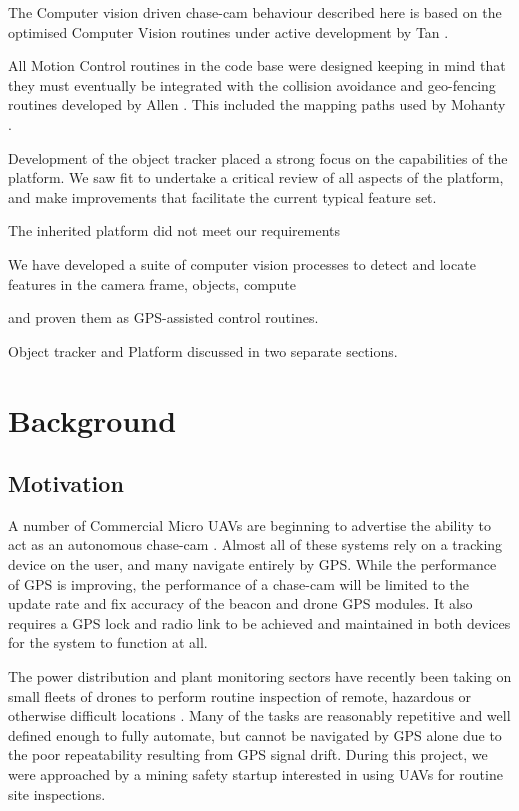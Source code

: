 \documentclass{article}
\begin{document}
    The Computer vision driven chase-cam behaviour described here is based on the optimised Computer Vision routines under active development by Tan \cite{Tan}.

    All Motion Control routines in the code base were designed keeping in mind that they must eventually be integrated with the collision avoidance and geo-fencing routines developed by Allen \cite{Allen}.  This included the mapping paths used by Mohanty \cite{Mohanty}.

    Development of the object tracker placed a strong focus on the capabilities of the platform.  We saw fit to undertake a critical review of all aspects of the platform, and make improvements that facilitate the current typical feature set.

    The inherited platform did not meet our requirements

    We have developed a suite of computer vision processes to detect and locate features in the camera frame,  objects, compute 

    and proven them as GPS-assisted control routines.

    Object tracker and Platform discussed in two separate sections.


  \section{Background}


    \subsection{Motivation}

      A number of Commercial Micro UAVs are beginning to advertise the ability to act as an autonomous chase-cam \cite{Lily} \cite{AirDog}.  Almost all of these systems rely on a tracking device on the user, and many navigate entirely by GPS.  While the performance of GPS is improving, the performance of a chase-cam will be limited to the update rate and fix accuracy of the beacon and drone GPS modules.  It also requires a GPS lock and radio link to be achieved and maintained in both devices for the system to function at all.

      The power distribution and plant monitoring sectors have recently been taking on small fleets of drones to perform routine inspection of remote, hazardous or otherwise difficult locations \cite{RopeAccess}.  Many of the tasks are reasonably repetitive and well defined enough to fully automate, but cannot be navigated by GPS alone due to the poor repeatability resulting from GPS signal drift.
      During this project, we were approached by a mining safety startup interested in using UAVs for routine site inspections.
\end{document}
